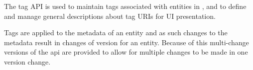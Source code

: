 The tag API is used to maintain tags associated with entities in \Rapture, and to
define and manage general descriptions about tag URIs for UI presentation.

Tags are applied to the metadata of an entity and as such changes to the metadata
result in changes of version for an entity. Because of this multi-change versions of
the api are provided to allow for multiple changes to be made in one version change.
